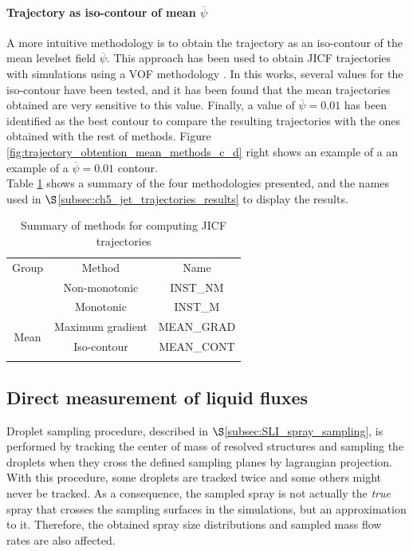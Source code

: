 \paragraph{Trajectory as iso-contour of mean $\overline{\psi}$}

A more intuitive methodology is to obtain the trajectory as an iso-contour of the mean levelset field $\overline{\psi}$. This approach has been used to obtain JICF trajectories with simulations using a VOF methodology . In this works, several values for the iso-contour have been tested, and it has been found that the mean trajectories obtained are very sensitive to this value. Finally, a value of $\overline{\psi} = 0.01$ has been identified as the best contour to compare the resulting trajectories with the ones obtained with the rest of methods. Figure \ref{fig:trajectory_obtention_mean_methods_c_d} right shows an example of a an example of a $\overline{\psi} = 0.01$ contour. \\

Table \ref{tab:jicf_tools_trajectories_obtention} shows a summary of the four methodologies presented, and the names used in $\S$\ref{subsec:ch5_jet_trajectories_results} to display the results.

\begin{table}[!h]
\centering
\caption{Summary of methods for computing JICF trajectories}
\begin{tabular}{ccc}
\thickhline
Group & Method & Name \\
\thickhline
\multirow{2}{*}{Instantaneous} & Non-monotonic & INST\_NM \\
 & Monotonic & INST\_M \\
 \hline
\multirow{2}{*}{Mean} & Maximum gradient & MEAN\_GRAD \\
 & Iso-contour & MEAN\_CONT \\
\thickhline
\end{tabular}
\label{tab:jicf_tools_trajectories_obtention}
\end{table}

\subsection{Direct measurement of liquid fluxes}
\label{subsec:ch5_interior_boundaries}

Droplet sampling procedure, described in $\S$\ref{subsec:SLI_spray_sampling}, is performed by tracking the center of mass of resolved structures and sampling the droplets when they cross the defined sampling planes by lagrangian projection. With this procedure, some droplets are tracked twice and some others might never be tracked. As a consequence, the sampled spray is not actually the \textsl{true} spray that crosses the sampling surfaces in the simulations, but an approximation to it. Therefore, the obtained spray size distributions and sampled mass flow rates are also affected.

